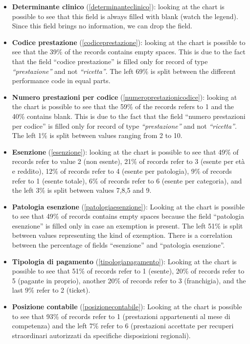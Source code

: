 \documentclass[paper=a4, fontsize=11pt]{scrartcl} %
\numberwithin{equation}{section} %
\numberwithin{figure}{section} %
\numberwithin{table}{section} %
\begin{document}
\begin{itemize}
\item \textbf{Determinante clinico} (\ref{determinanteclinico}): looking at the chart is possible to see that this field is always filled with blank (watch the legend). Since this field brings no information, we can drop the field.
\item \textbf{Codice prestazione} (\ref{codiceprestazione}): looking at the chart is possible to see that the 39\% of the records contains empty spaces. This is due to the fact that the field ``codice prestazione'' is filled only for record of type \textit{``prestazione''} and not \textit{``ricetta''}. The left 69\% is split between the different performance code in equal parts.
\item \textbf{Numero prestazioni per codice} (\ref{numeroprestazionicodice}): looking at the chart is possible to see that the 59\% of the records refers to 1 and the 40\% contains blank. This is due to the fact that the field ``numero prestazioni per codice'' is filled only for record of type \textit{``prestazione''} and not \textit{``ricetta''}. The left 1\% is split between values ranging from 2 to 10. 
\item \textbf{Esenzione} (\ref{esenzione}): looking at the chart is possible to see that 49\% of records refer to value 2 (non esente), 21\% of records refer to 3 (esente per età e reddito), 12\% of records refer to 4 (esente per patologia), 9\% of records refer to 1 (esente totale), 6\% of records refer to 6 (esente per categoria), and the left 3\% is split between values 7,8,5 and 9.
\item \textbf{Patologia esenzione} (\ref{patologiaesenzione}): Looking at the chart is possible to see that 49\% of records contains empty spaces because the field ``patologia esenzione'' is filled only in case an exemption is present. The left 51\% is split between values representing the kind of exemption. There is a correlation between the percentage of fields ``esenzione'' and ``patologia esenzione''.
\item \textbf{Tipologia di pagamento} (\ref{tipologiapagamento}): Looking at the chart is possible to see that 51\% of records refer to 1 (esente), 20\% of records refer to 5 (pagante in proprio), another 20\% of records refer to 3 (franchigia), and the last 9\% refer to 2 (ticket).
\item \textbf{Posizione contabile} (\ref{posizionecontabile}): Looking at the chart is possible to see that 93\% of records refer to 1 (prestazioni appartenenti al mese di competenza) and the left 7\% refer to 6 (prestazioni accettate per recuperi straordinari autorizzati da specifiche disposizioni regionali).

\end{itemize}
\end{document}
